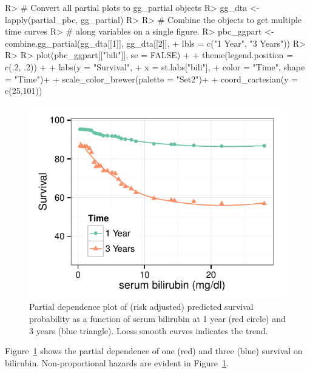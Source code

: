 \documentclass[nojss]{jss}\usepackage[]{graphicx}\usepackage[]{color}
\makeatletter
\def\maxwidth{ %
  \ifdim\Gin@nat@width>\linewidth
    \linewidth
  \else
    \Gin@nat@width
  \fi
}
\makeatother
\begin{document}
\begin{Schunk}
\begin{Sinput}
R> # Convert all partial plots to gg_partial objects
R> gg_dta <- lapply(partial_pbc, gg_partial)
R> 
R> # Combine the objects to get multiple time curves 
R> # along variables on a single figure.
R> pbc_ggpart <- combine.gg_partial(gg_dta[[1]], gg_dta[[2]], 
+                                  lbls = c("1 Year", "3 Years"))
R> 
R> 
R> plot(pbc_ggpart[["bili"]], se = FALSE) + 
+   theme(legend.position = c(.2, .2)) + 
+   labs(y = "Survival", 
+        x = st.labs["bili"],
+        color = "Time", shape = "Time")+
+   scale_color_brewer(palette = "Set2")+
+   coord_cartesian(y = c(25,101))
\end{Sinput}
\begin{figure}[!htpb]

{\centering \includegraphics[width=\maxwidth]{figure/rfs-pbc-partial-bili-1} 

}

\caption[Partial dependence plot of (risk adjusted) predicted survival probability as a function of serum bilirubin at 1 year (red circle) and 3 years (blue triangle)]{Partial dependence plot of (risk adjusted) predicted survival probability as a function of serum bilirubin at 1 year (red circle) and 3 years (blue triangle). Loess smooth curves indicates the trend.\label{fig:pbc-partial-bili}}
\end{figure}
\end{Schunk}

Figure~\ref{fig:pbc-partial-bili} shows the partial dependence of one (red) and three (blue) survival on bilirubin. Non-proportional hazards are evident in Figure~\ref{fig:pbc-partial-bili}.
\end{document}
